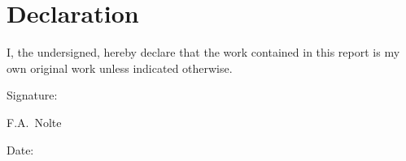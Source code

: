 \chapter{Declaration}

I, the undersigned, hereby declare that the work contained in this report is my own original
work unless indicated otherwise.\par
\vspace{3cm}

\noindent%
\parbox{.5\textwidth}{%
  Signature:\quad\dotfill\par
  \hfill F.A.\ Nolte\hspace{1.2cm}\null}


\vspace{1.5cm}
\noindent%
\parbox{.5\textwidth}{%
  Date:\quad\dotfill\par}
